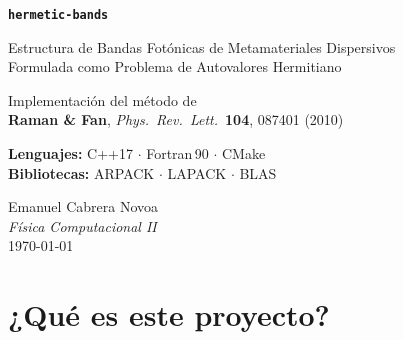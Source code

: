 \documentclass[12pt,a4paper]{article}
\begin{document}
\begin{titlepage}
    \centering
    \vspace*{2cm}

    {\Huge\bfseries \texttt{hermetic-bands}\par}
    \vspace{0.5cm}
    {\large Estructura de Bandas Fotónicas de Metamateriales Dispersivos\\
    Formulada como Problema de Autovalores Hermitiano\par}

    \vspace{1.5cm}


    \vspace{1cm}

    {\large Implementación del método de\\[4pt]
    \textbf{Raman \& Fan}, \textit{Phys.\ Rev.\ Lett.}\ \textbf{104}, 087401 (2010)\par}

    \vspace{2cm}

    \begin{infobox}
        \centering
        \textbf{Lenguajes:} C++17 $\cdot$ Fortran\,90 $\cdot$ CMake\\[4pt]
        \textbf{Bibliotecas:} ARPACK $\cdot$ LAPACK $\cdot$ BLAS
    \end{infobox}

    \vfill

    {\large Emanuel Cabrera Novoa\\[4pt]
    \textit{Física Computacional II}\\[4pt]
    \today\par}
\end{titlepage}

\tableofcontents
\newpage

\section{¿Qué es este proyecto?}
\end{document}
